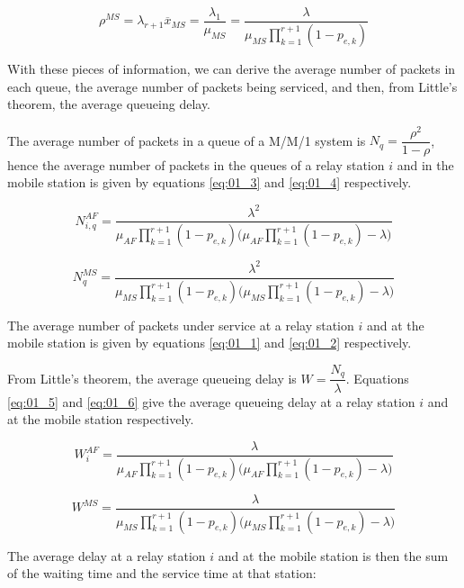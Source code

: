 \begin{equation}
  \rho^{MS} = \lambda_{r+1} \overline{x}_{MS} = \dfrac{\lambda_1}{\mu_{MS}} = \dfrac{\lambda}{\mu_{MS}\prod\limits_{k=1}^{r+1} (1 - p_{e,k})}
  \label{eq:01_2}
\end{equation}

With these pieces of information, we can derive the average number of packets
in each queue, the average number of packets being serviced, and then, from
Little's theorem, the average queueing delay.

The average number of packets in a queue of a M/M/1 system is
$N_q = \dfrac{\rho^2}{1-\rho}$, hence the average number of packets in the queues
of a relay station $i$ and in the mobile station is given by equations
\ref{eq:01_3} and \ref{eq:01_4} respectively.

\begin{equation}
  N_{i,q}^{AF} = \dfrac{\lambda^2}{\mu_{AF} \prod\limits_{k=1}^{r+1} (1 - p_{e,k})\Big(\mu_{AF}\prod\limits_{k=1}^{r+1} (1 - p_{e,k}) - \lambda\Big)}
  \label{eq:01_3}
\end{equation}

\begin{equation}
  N_q^{MS} = \dfrac{\lambda^2}{\mu_{MS} \prod\limits_{k=1}^{r+1} (1 - p_{e,k})\Big(\mu_{MS}\prod\limits_{k=1}^{r+1} (1 - p_{e,k}) - \lambda\Big)}
  \label{eq:01_4}
\end{equation}

The average number of packets under service at a relay station $i$ and at the
mobile station is given by equations \ref{eq:01_1} and \ref{eq:01_2} respectively.

From Little's theorem, the average queueing delay is $W = \dfrac{N_q}{\lambda}$.
Equations \ref{eq:01_5} and \ref{eq:01_6} give the average queueing delay at a
relay station $i$ and at the mobile station respectively.

\begin{equation}
  W_i^{AF} = \dfrac{\lambda}{\mu_{AF} \prod\limits_{k=1}^{r+1} (1 - p_{e,k})\Big(\mu_{AF}\prod\limits_{k=1}^{r+1} (1 - p_{e,k}) - \lambda\Big)}
  \label{eq:01_5}
\end{equation}

\begin{equation}
  W^{MS} = \dfrac{\lambda}{\mu_{MS} \prod\limits_{k=1}^{r+1} (1 - p_{e,k})\Big(\mu_{MS}\prod\limits_{k=1}^{r+1} (1 - p_{e,k}) - \lambda\Big)}
  \label{eq:01_6}
\end{equation}


The average delay at a relay station $i$ and at the mobile station is then the
sum of the waiting time and the service time at that station:

